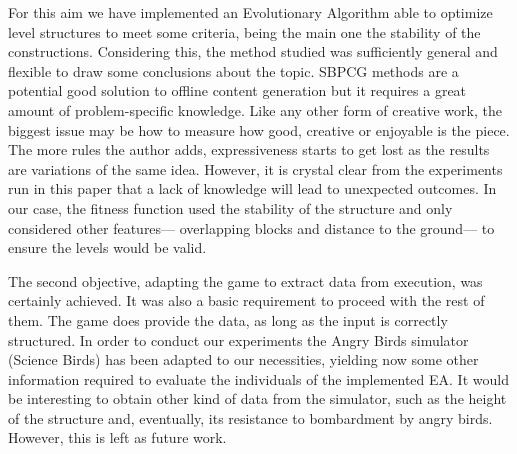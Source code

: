 \documentclass[runningheads,a4paper]{llncs}
\begin{document}
For this aim we have implemented an Evolutionary Algorithm able to optimize 
level structures to meet some criteria, being the main one the stability of the 
constructions.
Considering this, the method studied was
sufficiently general and flexible to draw some conclusions about the
topic. SBPCG methods are a potential good solution to offline content
generation but it requires a great amount of problem-specific
knowledge. Like any other form of creative work, the biggest issue may
be how to measure how good, creative or enjoyable is the piece. The
more rules the author adds, expressiveness starts to get lost as the
results are variations of the same idea. However, it is crystal clear
from the experiments run in this paper that a lack of knowledge
will lead to unexpected outcomes.
In our case, the fitness function used the 
stability of the structure and only considered other features--- overlapping 
blocks and distance to the ground--- to ensure the levels would be valid.


The second objective, adapting the game to extract data from execution, was 
certainly achieved. It was also a basic requirement to proceed with the rest of 
them. The game does provide the data, as long as the input is correctly 
structured. 
In order to conduct our experiments the Angry Birds simulator (Science Birds) 
has been adapted to our necessities, yielding now some  other information 
required to evaluate the individuals of the implemented EA.
It would be interesting to obtain other kind of data from the simulator,
such as the height of the structure and, eventually, its resistance to
bombardment by angry birds. However, this is left as future work.
\end{document}
